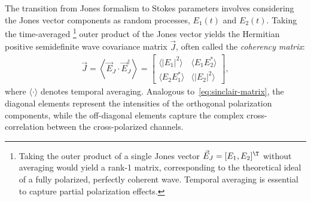 The transition from Jones formalism to Stokes parameters involves considering the Jones vector components as random processes, $E_1(t)$ and $E_2(t)$.
Taking the time-averaged%
    \footnote{
        Taking the outer product of a single Jones vector $\vec E_J=[E_1,E_2]^\T$ without averaging would yield a rank-1 matrix, corresponding to the theoretical ideal of a fully polarized, perfectly coherent wave.
        Temporal averaging is essential to capture partial polarization effects.
    }
outer product of the Jones vector yields the Hermitian positive semidefinite wave covariance matrix $\vec J$, often called the \emph{coherency matrix}:
\begin{align}
    \label{eq:coherency-matrix}
    \vec J = \left\langle \vec E_J \cdot \vec E_J^\dagger \right\rangle = \begin{bmatrix}
        \langle |E_1|^2 \rangle & \langle E_1 E_2^* \rangle \\
        \langle E_2 E_1^* \rangle & \langle |E_2|^2 \rangle
    \end{bmatrix},
\end{align}
where $\langle \cdot \rangle$ denotes temporal averaging.
Analogous to~\cref{eq:sinclair-matrix}, the diagonal elements represent the intensities of the orthogonal polarization components, while the off-diagonal elements capture the complex cross-correlation between the cross-polarized channels.

